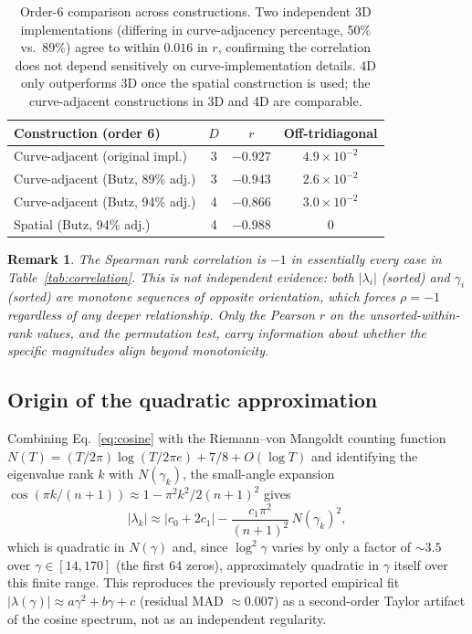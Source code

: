 \documentclass[11pt,a4paper]{article}
\newtheorem{remark}{Remark}
\begin{document}
\begin{table}[h]
\centering
\begin{tabular}{lccc}
\toprule
Construction (order 6) & $D$ & $r$ & Off-tridiagonal\\
\midrule
Curve-adjacent (original impl.) & 3 & $-0.927$ & $4.9\times10^{-2}$\\
Curve-adjacent (Butz, 89\% adj.) & 3 & $-0.943$ & $2.6\times10^{-2}$\\
Curve-adjacent (Butz, 94\% adj.) & 4 & $-0.866$ & $3.0\times10^{-2}$\\
Spatial (Butz, 94\% adj.) & 4 & $-0.988$ & $0$\\
\bottomrule
\end{tabular}
\caption{Order-6 comparison across constructions. Two independent 3D
implementations (differing in curve-adjacency percentage, 50\% vs.\ 89\%)
agree to within $0.016$ in $r$, confirming the correlation does not depend
sensitively on curve-implementation details. 4D only outperforms 3D once
the spatial construction is used; the curve-adjacent constructions in 3D
and 4D are comparable.}
\label{tab:order6}
\end{table}

\begin{remark}
The Spearman rank correlation is $-1$ in essentially every case in
Table~\ref{tab:correlation}. This is not independent evidence: both
$|\lambda_i|$ (sorted) and $\gamma_i$ (sorted) are monotone sequences of
opposite orientation, which forces $\rho=-1$ regardless of any deeper
relationship. Only the Pearson $r$ on the \emph{unsorted-within-rank}
values, and the permutation test, carry information about whether the
specific magnitudes align beyond monotonicity.
\end{remark}

\subsection{Origin of the quadratic approximation}

Combining Eq.~\eqref{eq:cosine} with the Riemann--von Mangoldt counting
function $N(T) = (T/2\pi)\log(T/2\pi e) + 7/8 + O(\log T)$ and identifying
the eigenvalue rank $k$ with $N(\gamma_k)$, the small-angle expansion
$\cos(\pi k/(n+1)) \approx 1 - \pi^2k^2/2(n+1)^2$ gives
\begin{equation}
|\lambda_k| \approx |c_0+2c_1| - \frac{c_1\pi^2}{(n+1)^2}\,N(\gamma_k)^2,
\end{equation}
which is quadratic in $N(\gamma)$ and, since $\log^2\gamma$ varies by only a
factor of $\sim 3.5$ over $\gamma\in[14,170]$ (the first 64 zeros),
approximately quadratic in $\gamma$ itself over this finite range. This
reproduces the previously reported empirical fit $|\lambda(\gamma)|\approx
a\gamma^2+b\gamma+c$ (residual MAD $\approx 0.007$) as a second-order Taylor
artifact of the cosine spectrum, not as an independent regularity.
\end{document}
